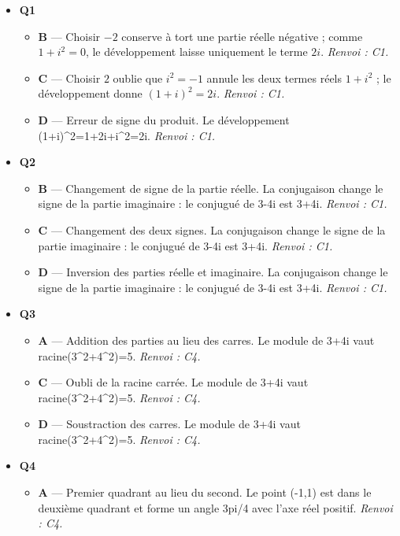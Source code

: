 \begin{itemize}
  \item \textbf{Q1}
  \begin{itemize}
    \item \textbf{B} — Choisir $-2$ conserve à tort une partie réelle négative ; comme $1+i^2=0$, le développement laisse uniquement le terme $2i$. \emph{Renvoi : C1.}
    \item \textbf{C} — Choisir $2$ oublie que $i^2=-1$ annule les deux termes réels $1+i^2$ ; le développement donne $(1+i)^2=2i$. \emph{Renvoi : C1.}
    \item \textbf{D} — Erreur de signe du produit. Le développement (1+i)\textasciicircum{}2=1+2i+i\textasciicircum{}2=2i. \emph{Renvoi : C1.}
  \end{itemize}
  \item \textbf{Q2}
  \begin{itemize}
    \item \textbf{B} — Changement de signe de la partie réelle. La conjugaison change le signe de la partie imaginaire : le conjugué de 3-4i est 3+4i. \emph{Renvoi : C1.}
    \item \textbf{C} — Changement des deux signes. La conjugaison change le signe de la partie imaginaire : le conjugué de 3-4i est 3+4i. \emph{Renvoi : C1.}
    \item \textbf{D} — Inversion des parties réelle et imaginaire. La conjugaison change le signe de la partie imaginaire : le conjugué de 3-4i est 3+4i. \emph{Renvoi : C1.}
  \end{itemize}
  \item \textbf{Q3}
  \begin{itemize}
    \item \textbf{A} — Addition des parties au lieu des carres. Le module de 3+4i vaut racine(3\textasciicircum{}2+4\textasciicircum{}2)=5. \emph{Renvoi : C4.}
    \item \textbf{C} — Oubli de la racine carrée. Le module de 3+4i vaut racine(3\textasciicircum{}2+4\textasciicircum{}2)=5. \emph{Renvoi : C4.}
    \item \textbf{D} — Soustraction des carres. Le module de 3+4i vaut racine(3\textasciicircum{}2+4\textasciicircum{}2)=5. \emph{Renvoi : C4.}
  \end{itemize}
  \item \textbf{Q4}
  \begin{itemize}
    \item \textbf{A} — Premier quadrant au lieu du second. Le point (-1,1) est dans le deuxième quadrant et forme un angle 3pi/4 avec l'axe réel positif. \emph{Renvoi : C4.}

\end{itemize}
\end{itemize}
